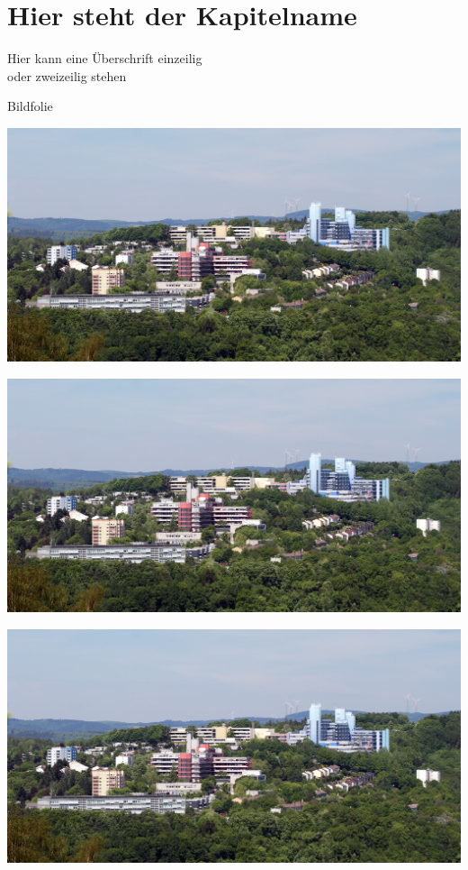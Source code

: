 \documentclass[aspectratio=169]{beamer}
\begin{document}
\section{Hier steht der Kapitelname}

\begin{frame}{Hier kann eine Überschrift einzeilig\\oder zweizeilig stehen}
	\blindtext
\end{frame}

\begin{frame}{Bildfolie}
	\begin{minipage}{.31\textwidth}
		\includegraphics[width=\textwidth]{img/progress.jpg}
		
	\end{minipage}
	\hfill
	\begin{minipage}{.31\textwidth}
		\includegraphics[width=\textwidth]{img/progress.jpg}
		
	\end{minipage}
	\hfill
	\begin{minipage}{.31\textwidth}
		\includegraphics[width=\textwidth]{img/progress.jpg}
		

\end{minipage}
\end{frame}
\end{document}

